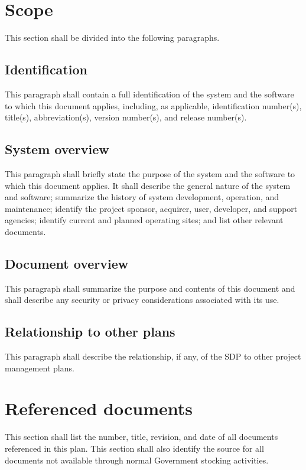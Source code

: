 \documentclass{fidata-report-template}
\begin{document}
\section{Scope}

This section shall be divided into the following paragraphs.

\subsection{Identification}

This paragraph shall contain a full identification of the system and the
software to which this document applies, including, as applicable,
identification number(s), title(s), abbreviation(s), version number(s),
and release number(s).

\subsection{System overview}

This paragraph shall briefly state the purpose of the system and the
software to which this document applies. It shall describe the general
nature of the system and software; summarize the history of system
development, operation, and maintenance; identify the project sponsor,
acquirer, user, developer, and support agencies; identify current and
planned operating sites; and list other relevant documents.

\subsection{Document overview}

This paragraph shall summarize the purpose and contents of this document
and shall describe any security or privacy considerations associated
with its use.

\subsection{Relationship to other plans}

This paragraph shall describe the relationship, if any, of the SDP to
other project management plans.

\section{Referenced documents}

This section shall list the number, title, revision, and date of all
documents referenced in this plan. This section shall also identify the
source for all documents not available through normal Government
stocking activities.
\end{document}
